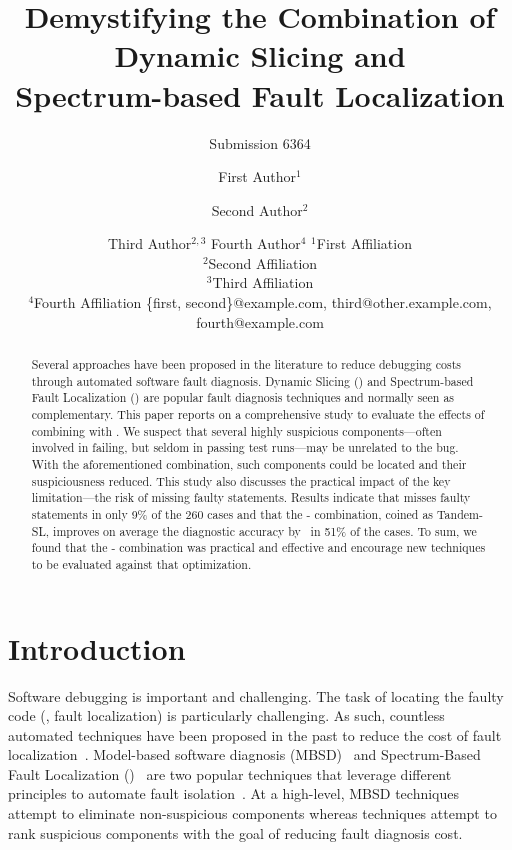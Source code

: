\documentclass{article}
\title{Demystifying the Combination of Dynamic Slicing and \\ Spectrum-based Fault
Localization}
\author{
    Submission 6364
}
\author{
First Author$^1$
\and
Second Author$^2$\and
Third Author$^{2,3}$\And
Fourth Author$^4$
\affiliations
$^1$First Affiliation\\
$^2$Second Affiliation\\
$^3$Third Affiliation\\
$^4$Fourth Affiliation
\emails
\{first, second\}@example.com,
third@other.example.com,
fourth@example.com
}
\begin{document}
\maketitle

\begin{abstract}
Several approaches have been proposed in the literature to reduce
debugging costs through automated software fault diagnosis.  Dynamic
Slicing (\ds{}) and Spectrum-based Fault Localization (\sfl{}) are
popular fault diagnosis techniques and normally seen as complementary.
This paper reports on a comprehensive study
to evaluate the effects of combining \ds{} with \sfl{}. We suspect
that several highly suspicious components---often involved in failing,
but seldom in passing test runs---may be unrelated to the bug. With
the aforementioned combination, such components could be located and
their suspiciousness reduced.  This study also discusses the practical
impact of the \ds{} key limitation---the risk of missing faulty
statements. Results indicate that \ds{} misses faulty statements in
only 9\% of the 260 cases and that
the \ds{}-\sfl{} combination, coined as Tandem-SL, improves on average
the diagnostic accuracy by \avgImprov\ in 51\% of the cases. To sum,
we found that the \ds{}-\sfl{} combination was practical and effective
and encourage new \sfl{} techniques to be evaluated against that
optimization.
\end{abstract}


\section{Introduction}

Software debugging is important and challenging. The task of locating
the faulty code (\ie{}, fault localization) is particularly
challenging. As such, countless automated techniques have been
proposed in the past to reduce the cost of fault
localization~\cite{7390282}. Model-based software diagnosis
(MBSD)~\cite{REITER198757,DEKLEER200325} and Spectrum-Based Fault
Localization (\sfl{})~\cite{DBLP:journals/stvr/HarroldRSWY00} are two
popular techniques that leverage different principles to automate
fault isolation~\cite{DBLP:conf/sac/AbreuGZG08}.  At a high-level,
MBSD
techniques~\cite{wotawa2002model,Mayer:2008:EMM:1642931.1642950,mayer2008prioritising,Perez:2018:LQR:3304889.3304927,Ko:2008:DRA:1368088.1368130}
attempt to eliminate non-suspicious components whereas \sfl{}
techniques attempt to rank suspicious components with the goal of
reducing fault diagnosis cost.
\end{document}
